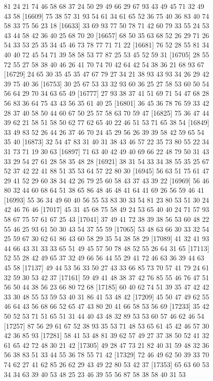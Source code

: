 \documentclass{article}
\begin{document}
\begin{figure}[H]
\begin{Schunk}
\begin{Soutput}
[16585] 81 24 21 74 46 58 68 37 24 50 29 49 66 29 67 93 43 49 45 71 32 49 43 58
[16609] 75 38 57 31 93 54 61 34 61 65 52 36 75 40 36 83 40 74 58 33 75 56 23 18
[16633] 33 69 93 77 50 78 71 42 60 79 33 55 24 53 43 44 58 42 36 40 25 68 70 20
[16657] 68 50 35 63 68 52 26 29 71 26 54 33 53 25 35 34 45 46 73 78 77 71 71 22
[16681] 76 52 28 55 81 34 40 40 72 45 54 71 39 58 58 53 77 87 25 53 45 52 59 31
[16705] 28 55 72 55 27 58 38 40 46 26 41 70 74 70 42 64 42 54 38 36 21 68 93 67
[16729] 24 65 30 35 45 35 47 67 79 27 34 21 38 93 43 93 34 26 29 42 39 75 40 36
[16753] 30 25 67 53 33 32 93 60 36 25 27 58 53 60 50 54 56 64 29 70 34 63 65 49
[16777] 27 93 38 37 41 51 69 71 54 47 68 28 56 83 36 64 75 43 43 56 35 61 40 25
[16801] 36 45 36 78 76 59 33 42 28 37 40 58 50 44 60 67 50 25 57 58 63 70 59 47
[16825] 75 36 47 44 39 62 21 58 51 58 50 62 77 62 65 40 22 46 51 53 71 65 38 54
[16849] 33 49 83 52 26 44 26 37 46 70 24 45 29 56 26 39 39 58 42 59 65 54 35 40
[16873] 32 54 47 83 31 40 31 38 43 46 57 22 35 73 80 55 22 34 31 73 71 19 30 63
[16897] 71 63 40 42 49 40 69 66 22 48 79 50 31 43 33 29 54 27 61 28 58 35 48 28
[16921] 38 31 54 33 34 38 55 35 25 67 52 37 42 22 41 88 51 35 53 64 57 22 80 30
[16945] 56 63 51 75 61 47 29 41 52 29 60 38 34 42 26 79 25 60 58 43 37 43 39 22
[16969] 56 46 80 32 44 60 68 64 51 38 65 86 48 46 48 41 64 41 69 26 56 59 46 41
[16993] 55 36 34 49 60 40 56 55 53 83 30 33 54 81 23 80 53 51 30 24 42 46 76 46
[17017] 45 31 45 68 75 58 49 24 53 65 40 40 24 71 57 93 58 67 75 57 61 67 25 43
[17041] 37 49 41 72 38 39 38 56 53 60 48 22 55 46 25 93 61 50 30 43 54 37 55 59
[17065] 53 48 63 66 30 33 32 54 25 59 67 30 62 61 86 43 60 58 29 35 54 38 58 29
[17089] 41 32 41 93 44 66 43 31 33 33 65 51 49 45 57 50 78 48 52 55 26 64 31 65
[17113] 52 55 28 42 49 65 37 32 49 66 56 44 55 29 41 72 46 63 36 39 44 63 45 58
[17137] 49 44 53 56 33 50 27 43 33 66 85 73 70 57 41 79 24 61 32 59 30 53 42 37
[17161] 59 49 41 48 38 37 42 76 85 55 46 76 47 51 56 50 44 38 56 23 66 80 72 68
[17185] 60 40 62 74 51 39 35 47 42 42 33 30 48 55 53 59 53 40 31 86 41 53 48 42
[17209] 45 50 47 49 62 55 46 64 43 56 68 66 52 65 47 43 80 20 41 66 58 53 56 69
[17233] 35 42 50 52 53 71 51 65 51 31 44 40 43 48 32 89 53 53 60 57 46 62 46 54
[17257] 87 56 29 61 67 52 38 93 35 53 71 48 53 65 61 45 42 46 57 30 42 36 85 93
[17281] 58 41 53 48 81 39 62 57 49 27 37 38 50 52 41 32 61 65 42 72 48 30 21 42
[17305] 49 28 47 73 21 82 40 31 59 48 32 36 56 38 83 51 33 44 55 36 78 55 71 42
[17329] 72 46 49 62 50 39 33 70 74 62 27 41 62 85 26 62 29 43 49 22 80 53 42 37
[17353] 65 63 60 53 34 34 63 39 40 53 48 25 23 46 39 55 56 87 58 38 58 40 31 53

\end{Soutput}
\end{Schunk}
\end{figure}
\end{document}
